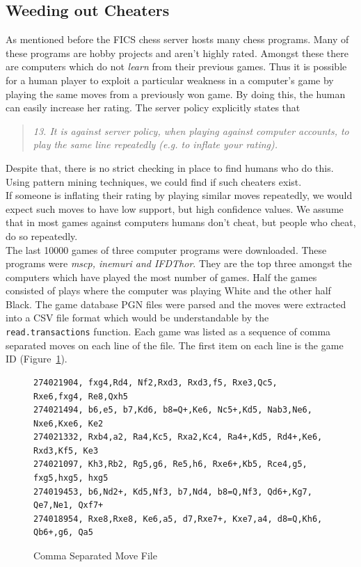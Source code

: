 \documentclass{article}
\begin{document}
\subsection{Weeding out Cheaters}
As mentioned before the FICS chess server hosts many chess programs. Many of these programs are hobby projects and aren't highly rated. Amongst these there are computers which do not {\sl learn} from their previous games. Thus it is possible for a human player to exploit a particular weakness in a computer's game by playing the same moves from a previously won game. By doing this, the human can easily increase her rating. The server policy explicitly states that \cite{web:ficspolicy}
\begin{quote}
{\sl 13. It is against server policy, when playing against computer accounts, to play the same line repeatedly (e.g. to inflate your rating).}
\end{quote}

Despite that, there is no strict checking in place to find humans who do this. Using pattern mining techniques, we could find if such cheaters exist.\\

If someone is inflating their rating by playing similar moves repeatedly, we would expect such moves to have low support, but  high confidence values. We assume that in most games against computers humans don't cheat, but people who cheat, do so repeatedly. \\

The last 10000 games of three computer programs were downloaded. These programs were {\sl mscp, inemuri and IFDThor}. They are the top three amongst the computers which have played the most number of games. Half the games consisted of plays where the computer was playing White and the other half Black. The game database PGN files were parsed and the moves were extracted into a CSV file format which would be understandable by the \verb=read.transactions= function. Each game was listed as a sequence of comma separated moves on each line of the file. The first item on each line is the game ID (Figure~\ref{fig:movecsv}).\\

\begin{figure}[htp]

\begin{verbatim}
274021904, fxg4,Rd4, Nf2,Rxd3, Rxd3,f5, Rxe3,Qc5, Rxe6,fxg4, Re8,Qxh5
274021494, b6,e5, b7,Kd6, b8=Q+,Ke6, Nc5+,Kd5, Nab3,Ne6, Nxe6,Kxe6, Ke2
274021332, Rxb4,a2, Ra4,Kc5, Rxa2,Kc4, Ra4+,Kd5, Rd4+,Ke6, Rxd3,Kf5, Ke3
274021097, Kh3,Rb2, Rg5,g6, Re5,h6, Rxe6+,Kb5, Rce4,g5, fxg5,hxg5, hxg5
274019453, b6,Nd2+, Kd5,Nf3, b7,Nd4, b8=Q,Nf3, Qd6+,Kg7, Qe7,Ne1, Qxf7+
274018954, Rxe8,Rxe8, Ke6,a5, d7,Rxe7+, Kxe7,a4, d8=Q,Kh6, Qb6+,g6, Qa5
\end{verbatim}
\caption{Comma Separated Move File}
\label{fig:movecsv}
\end{figure}
\end{document}
